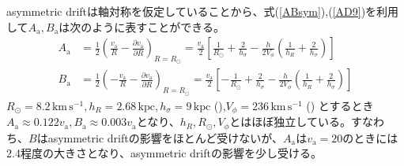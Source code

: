 asymmetric driftは軸対称を仮定していることから、式(\ref{ABsym}),(\ref{AD9})を利用して$A_{\mathrm{a}},B_{\mathrm{a}}$は次のように表すことができる。
\begin{subequations}
\begin{align}
	A_{\mathrm{a}} &=\frac{1}{2}\left( \frac{v_{\mathrm{a}}}{R} - \frac{\partial v_{\mathrm{a}}}{\partial R} \right)_{R=R_{\odot}} = \frac{v_{\mathrm{a}}}{2}\left[\frac{1}{R_{\odot}} + \frac{2}{h_{\sigma}} - \frac{h}{2V_{\phi}}\left(\frac{1}{h_R} + \frac{2}{h_{\sigma}}\right)\right] \\
	B_{\mathrm{a}} &=\frac{1}{2}\left( -\frac{v_{\mathrm{a}}}{R} - \frac{\partial v_{\mathrm{a}}}{\partial R} \right)_{R=R_{\odot}} = \frac{v_{\mathrm{a}}}{2}\left[-\frac{1}{R_{\odot}} + \frac{2}{h_{\sigma}} - \frac{h}{2V_{\phi}}\left(\frac{1}{h_R} + \frac{2}{h_{\sigma}}\right)\right]
\end{align} \label{ABaxisym}
\end{subequations}
$R_{\odot}=8.2\,\mathrm{km\,s^{-1}},h_R =2.68\,\mathrm{kpc}, h_{\sigma}=9\,\mathrm{kpc}$ (\cite{Piffl14}),$V_{\phi}=236\,\mathrm{km\,s^{-1}}$ (\cite{Kawata2019}) とするとき
$A_{\mathrm{a}}\approx0.122v_{\mathrm{a}}, B_{\mathrm{a}}\approx0.003v_{\mathrm{a}}$となり、$h_R,R_{\odot},V_{\phi}$とはほぼ独立している。すなわち、$B$はasymmetric driftの影響をほとんど受けないが、$A_{\mathrm{a}}$は$v_{\mathrm{a}}=20$のときには2.4程度の大きさとなり、asymmetric driftの影響を少し受ける。


